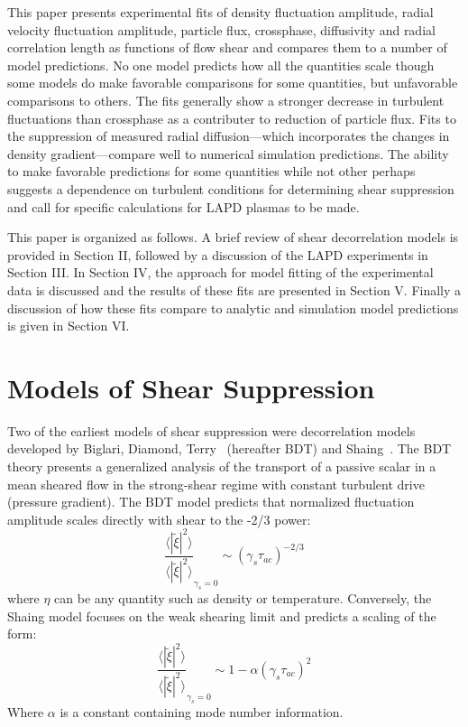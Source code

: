 \documentclass[aip,pop,amsmath,amssymb,preprint,superscriptaddress]{revtex4-1} %
\begin{document}
This paper presents experimental fits of density fluctuation amplitude, radial velocity fluctuation amplitude, particle flux, crossphase, diffusivity and radial correlation length as functions of flow shear and compares them to a number of model predictions. No one model predicts how all the quantities scale though some models do make favorable comparisons for some quantities, but unfavorable comparisons to others. The fits generally show a stronger decrease in turbulent fluctuations than crossphase as a contributer to reduction of particle flux. Fits to the suppression of measured radial diffusion---which incorporates the changes in density gradient---compare well to numerical simulation predictions. The ability to make favorable predictions for some quantities while not other perhaps suggests a dependence on turbulent conditions for determining shear suppression and call for specific calculations for LAPD plasmas to be made.

This paper is organized as follows.  A brief review of shear decorrelation models is provided in Section II, followed by a discussion of the LAPD experiments in Section III. In Section IV, the approach for model fitting of the experimental data is discussed and the results of these fits are presented in Section V. Finally a discussion of how these fits compare to analytic and simulation model predictions is given in Section VI.

\section{Models of Shear Suppression}

Two of the earliest models of shear suppression were decorrelation models developed by Biglari, Diamond, Terry~\cite{biglari90} (hereafter BDT) and Shaing~\cite{shaing90}. The BDT theory presents a generalized analysis of the transport of a passive scalar in a mean sheared flow in the strong-shear regime with constant turbulent drive (pressure gradient). The BDT model predicts that normalized fluctuation amplitude scales directly with shear to the -2/3 power:
%
\begin{equation}
\frac{\langle |\tilde{\xi}|^{2} \rangle}{\langle |\tilde{\xi}|^{2} \rangle}_{\gamma_{s}=0} \sim (\gamma_{s}\tau_{ac})^{-2/3}
\label{eq:BDT_theory}
\end{equation}
%
where $\eta$ can be any quantity such as density or temperature. Conversely, the Shaing model focuses on the weak shearing limit and predicts a scaling of the form:
%
\begin{equation}
\frac{\langle |\tilde{\xi}|^{2} \rangle}{\langle |\tilde{\xi}|^{2} \rangle}_{\gamma_{s}=0} \sim 1- \alpha(\gamma_{s}\tau_{ac})^2
\label{eq:shaing_theory}
\end{equation}
%
Where $\alpha$ is a constant containing mode number information. 
\end{document}
